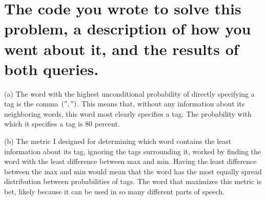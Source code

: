 \documentclass{article}
\begin{document}
\section{The code you wrote to solve this problem, a description of how you went about it, and
the results of both queries.}
(a) The word with the highest unconditional probability of directly specifying a tag is the comma $(",")$. This means that, without any information about its neighboring words, this word most clearly specifies a tag. The probability with which it specifies a tag is 80 percent. \newline

(b) The metric I designed for determining which word contains the least information about its tag, ignoring the tags surrounding it, worked by finding the word with the least difference between max and min.  Having the least difference between the max and min would mean that the word has the most equally spread distribution between probabilities of tags.
The word that maximizes this metric is bet, likely because it can be used in so many different parts of speech. 
\end{document}
